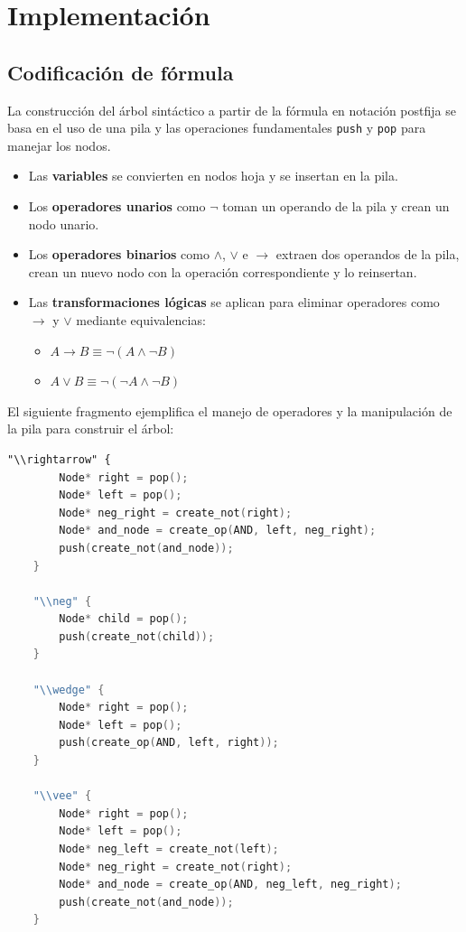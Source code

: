 \documentclass{report}
\begin{document}
	\section{Implementaci\'on}
	\subsection{Codificaci\'on de f\'ormula}

	La construcci\'on del \'arbol sint\'actico a partir de la f\'ormula en notaci\'on postfija se basa en el uso de una pila y las operaciones fundamentales \texttt{push} y \texttt{pop} para manejar los nodos.

	\begin{itemize}
		\item Las \textbf{variables} se convierten en nodos hoja y se insertan en la pila.
		\item Los \textbf{operadores unarios} como $\neg$ toman un operando de la pila y crean un nodo unario.
		\item Los \textbf{operadores binarios} como $\wedge$, $\vee$ e $\rightarrow$ extraen dos operandos de la pila, crean un nuevo nodo con la operaci\'on correspondiente y lo reinsertan.
		\item Las \textbf{transformaciones l\'ogicas} se aplican para eliminar operadores como $\rightarrow$ y $\vee$ mediante equivalencias:
		\begin{itemize}
			\item $A \rightarrow B \equiv \neg (A \wedge \neg B)$
			\item $A \vee B \equiv \neg (\neg A \wedge \neg B)$
		\end{itemize}
	\end{itemize}

	El siguiente fragmento ejemplifica el manejo de operadores y la manipulaci\'on de la pila para construir el \'arbol:

	\begin{lstlisting}[language=Lex, caption={Manejo de pila y reescritura lógica durante la construcción del árbol}]
	"\\rightarrow" {
		Node* right = pop();
		Node* left = pop();
		Node* neg_right = create_not(right);
		Node* and_node = create_op(AND, left, neg_right);
		push(create_not(and_node));
	}

	"\\neg" {
		Node* child = pop();
		push(create_not(child));
	}

	"\\wedge" {
		Node* right = pop();
		Node* left = pop();
		push(create_op(AND, left, right));
	}

	"\\vee" {
		Node* right = pop();
		Node* left = pop();
		Node* neg_left = create_not(left);
		Node* neg_right = create_not(right);
		Node* and_node = create_op(AND, neg_left, neg_right);
		push(create_not(and_node));
	}
	\end{lstlisting}
\end{document}
